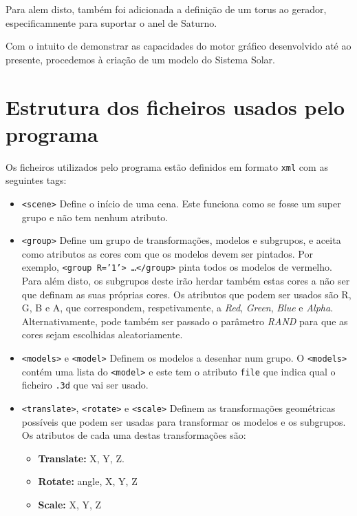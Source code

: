 \documentclass[a4paper]{article}
\begin{document}
Para alem disto, também foi adicionada a definição de um torus ao gerador, especificamnente para suportar o anel de Saturno.

Com o intuito de demonstrar as capacidades do motor gráfico desenvolvido até ao presente, procedemos à criação de um modelo do Sistema Solar.

\section{Estrutura dos ficheiros usados pelo programa}\label{sec:estrutura-ficheiros}

Os ficheiros utilizados pelo programa estão definidos em formato \texttt{xml} com as seguintes tags:
\begin{itemize}
    \item \texttt{<scene>} Define o início de uma cena. Este funciona como se fosse um super grupo e não tem nenhum atributo.
    \item \texttt{<group>} Define um grupo de transformações, modelos e
        subgrupos, e aceita como atributos as cores com que os modelos devem ser pintados.
        Por exemplo,
        \texttt{<group R='1'> \ldots </group>} pinta todos os modelos de vermelho.
        Para além disto, os subgrupos deste irão herdar também estas cores a não ser
        que definam as suas próprias cores. Os atributos que podem ser usados 
        são R, G, B e A, que correspondem, respetivamente, a \textit{Red},
        \textit{Green}, \textit{Blue} e \textit{Alpha}. Alternativamente, pode também ser passado
        o parâmetro \textit{RAND} para que as cores sejam escolhidas aleatoriamente.
    \item \texttt{<models>} e \texttt{<model>} Definem os modelos a desenhar
        num grupo. O \texttt{<models>} contém uma lista do \texttt{<model>} e este tem o atributo
        \texttt{file} que indica qual o ficheiro \texttt{.3d} que vai ser usado.
    \item \texttt{<translate>}, \texttt{<rotate>} e \texttt{<scale>} Definem as
        transformações geométricas possíveis que podem ser usadas para transformar os
        modelos e os subgrupos. Os atributos de cada uma destas transformações são:
        \begin{itemize}
            \item \textbf{Translate:} X, Y, Z.
            \item \textbf{Rotate:} angle, X, Y, Z
            \item \textbf{Scale:} X, Y, Z
        \end{itemize}
\end{itemize}
\end{document}
